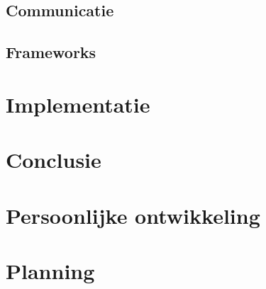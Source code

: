 \documentclass[a4paper,11pt,oneside]{report}
\begin{document}
\section{Communicatie}

\section{Frameworks}

\chapter{Implementatie}











\chapter{Conclusie}




\appendix
\chapter{Persoonlijke ontwikkeling}
\lipsum[1]

\chapter{Planning}
  \label{chap:planning}


\newpage

\printglossary


\renewcommand{\bibname}{Bronvermeldingen}



\nocite{*}

\end{document}
